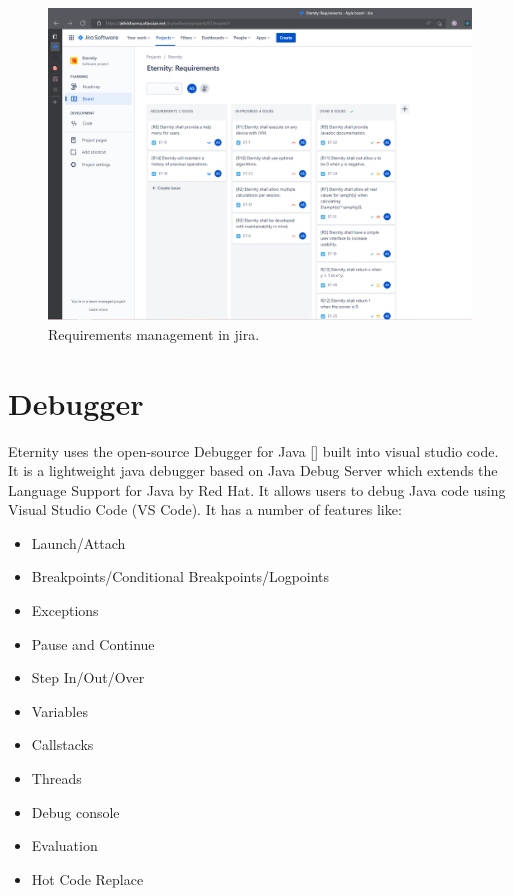 \documentclass[11pt,a4paper]{report}
\theoremstyle{definition}
\theoremstyle{remark}
\begin{document}
            \begin{figure}[htbp]
                \centering
                \includegraphics[width=\linewidth]{requirements_management.PNG}
                \caption{Requirements management in jira.}
                \label{fig:jira_requirement_management}
            \end{figure}
        
        \section{Debugger}
        Eternity uses the open-source Debugger for Java [] built into visual studio code.
        It is a lightweight java debugger based on Java Debug Server which extends the Language Support for Java by Red Hat. It allows users to debug Java code using Visual Studio Code (VS Code). It has a number of features like:
            \begin{itemize}
                \item Launch/Attach
                \item Breakpoints/Conditional Breakpoints/Logpoints
                \item Exceptions
                \item Pause and Continue
                \item Step In/Out/Over
                \item Variables
                \item Callstacks
                \item Threads
                \item Debug console
                \item Evaluation
                \item Hot Code Replace
            \end{itemize}
        
\end{document}
